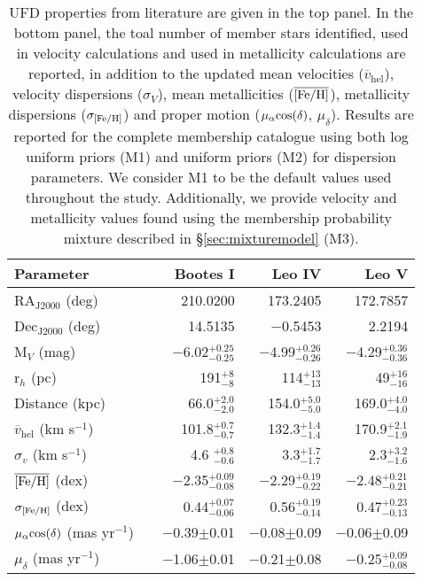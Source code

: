\begin{table}[htp!]
\centering
\notsotiny
\label{tab:obslog}
\centering
\caption{UFD properties from literature are given in the top panel. In the bottom panel, the toal number of member stars identified, used in velocity calculations and used in metallicity calculations are reported, in addition to the updated mean velocities ($\overline{v}_\mathrm{hel}$), velocity dispersions ($\sigma_V$), mean metallicities ($\overline{\rm[Fe/H]}$), metallicity dispersions ($\sigma_{\rm[Fe/H]}$) and proper motion ($\mu_{\alpha}\rm cos(\delta)$, $\mu_{\delta}$). Results are reported for the complete membership catalogue using both log uniform priors (M1) and uniform priors (M2) for dispersion parameters. We consider M1 to be the default values used throughout the study. Additionally, we provide velocity and metallicity values found using the membership probability mixture described in \S\ref{sec:mixturemodel} (M3).} \label{tab:table_dispersions}
\begin{tabular}{lrrrr}
\hline
\hline
 Parameter & & Bootes I & Leo IV & Leo V \\
\hline
RA$_\mathrm{J2000}$ (deg) & &  210.0200 &  173.2405 &  172.7857\\
Dec$_\mathrm{J2000}$ (deg) & & 14.5135 & $-$0.5453 & 2.2194\\
M$_V$ (mag) & & $-$6.02$^{+0.25}_{-0.25}$ & $-$4.99$^{+0.26}_{-0.26}$ & $-$4.29$^{+0.36}_{-0.36}$ \\
r$_h$ (pc) & & 191$^{+8}_{-8}$ & 114$^{+13}_{-13}$ & 49$^{+16}_{-16}$ \\
Distance (kpc) & & 66.0$^{+2.0}_{-2.0}$ & 154.0$^{+5.0}_{-5.0}$ & 169.0$^{+4.0}_{-4.0}$ \\
$\overline{v}_\mathrm{hel}$ (km s$^{-1}$) & & 101.8$^{+0.7}_{-0.7}$ & 132.3$^{+1.4}_{-1.4}$ & 170.9$^{+2.1}_{-1.9}$ \\
$\sigma_{v}$ (km s$^{-1}$) & & 4.6 $^{+0.8}_{-0.6}$ & 3.3$^{+1.7}_{-1.7}$ & 2.3$^{+3.2}_{-1.6}$ \\
$\overline{\rm[Fe/H]}$ (dex)& & $-$2.35$^{+0.09}_{-0.08}$& $-$2.29$^{+0.19}_{-0.22}$ & $-$2.48$^{+0.21}_{-0.21}$\\
$\sigma_{\rm[Fe/H]}$ (dex)&  & 0.44$^{+0.07}_{-0.06}$ & 0.56$^{+0.19}_{-0.14}$ & 0.47$^{+0.23}_{-0.13}$\\
$\mu_{\alpha}\rm cos(\delta)$ (mas yr$^{-1}$) & & $-$0.39$\pm$0.01 & $-$0.08$\pm$0.09 & $-$0.06$\pm$0.09\\
$\mu_{\delta}$ (mas yr$^{-1}$)& & $-$1.06$\pm$0.01 & $-$0.21$\pm$0.08 & $-$0.25$^{+0.09}_{-0.08}$\\

\end{tabular}
\end{table}
